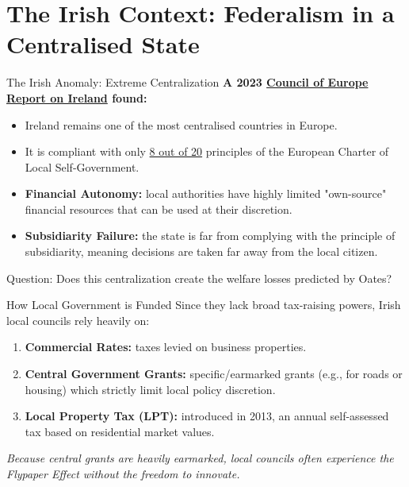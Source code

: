 \documentclass[10pt]{beamer}
\begin{document}
\section*{The Irish Context: Federalism in a Centralised State}

\begin{frame}{The Irish Anomaly: Extreme Centralization}
\textbf{A 2023 \href{https://rm.coe.int/monitoring-of-the-application-of-the-european-charter-of-local-self-go/1680acd809}{Council of Europe Report on Ireland} found:}
\begin{itemize}
\item Ireland remains one of the most centralised countries in Europe.
\item It is compliant with only \href{https://ailg.ie/european-body-issues-damning-report-on-irish-local-government/}{8 out of 20} principles of the European Charter of Local Self-Government.
\item \textbf{Financial Autonomy:} local authorities have highly limited "own-source" financial resources that can be used at their discretion.
\item \textbf{Subsidiarity Failure:} the state is far from complying with the principle of subsidiarity, meaning decisions are taken far away from the local citizen.
\end{itemize}
\vspace{0.3cm}
\alert{Question: Does this centralization create the welfare losses predicted by Oates?}
\end{frame}

\begin{frame}{How Local Government is Funded}
Since they lack broad tax-raising powers, Irish local councils rely heavily on:
\begin{enumerate}
\item \textbf{Commercial Rates:} taxes levied on business properties.
\item \textbf{Central Government Grants:} specific/earmarked grants (e.g., for roads or housing) which strictly limit local policy discretion.
\item \textbf{Local Property Tax (LPT):} introduced in 2013, an annual self-assessed tax based on residential market values.
\end{enumerate}
\vspace{0.3cm}
\textit{Because central grants are heavily earmarked, local councils often experience the Flypaper Effect without the freedom to innovate.}
\end{frame}
\end{document}
